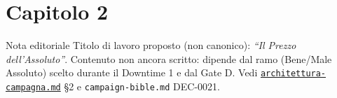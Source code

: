 \chapter*{Capitolo 2}
\label{chap:capitolo2}

\begin{DndComment}[]{Nota editoriale}
  Titolo di lavoro proposto (non canonico): \textit{``Il Prezzo dell'Assoluto''}. Contenuto non ancora scritto: dipende dal ramo (Bene/Male Assoluto) scelto durante il Downtime 1 e dal Gate D. Vedi \href{https://github.com/fpetrulio/child-of-balance/blob/main/docs/01-campaign-design/architettura-campagna.md}{\texttt{architettura-campagna.md}} §2 e \texttt{campaign-bible.md} DEC-0021.
\end{DndComment}
